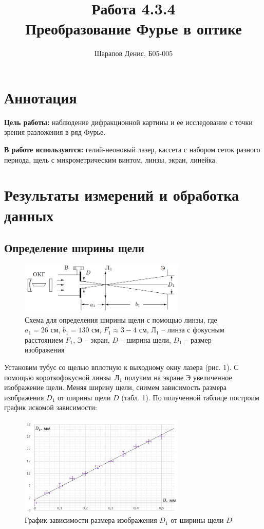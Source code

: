 \documentclass[a4paper]{article}
\title{Работа 4.3.4 \\ Преобразование Фурье в оптике}
\author{Шарапов Денис, Б05-005}
\date{}
\begin{document}
    \maketitle
    \tableofcontents
    \newpage
    
\section{Аннотация}

\noindent\textbf{Цель работы:} наблюдение дифракционной картины и ее исследование с точки зрения разложения в ряд Фурье. \smallskip
 
\noindent \textbf{В работе используются:} гелий-неоновый лазер, кассета с набором сеток разного периода, щель с микрометрическим винтом, линзы, экран, линейка.

\section{Результаты измерений и обработка данных}

\subsection{Определение ширины щели}

\begin{figure}[ht!]
    \centering
    \includegraphics[width = 0.7\textwidth]{image/scheme1.png}
    \caption{Схема для определения ширины щели с помощью линзы, где $a_1 = 26$ см, $b_1 = 130$ см, $F_1 \approx 3-4$ см, Л$_1$ -- линза с фокусным расстоянием $F_1$, Э -- экран, $D$ -- ширина щели, $D_1$ -- размер изображения}
\end{figure}

Установим тубус со щелью вплотную к выходному окну лазера (рис. 1). С помощью короткофокусной линзы~Л$_1$ получим на экране Э увеличенное изображение щели. Меняя ширину щели, снимем зависимость размера изображения $D_1$ от ширины щели $D$ (табл. 1). По полученной таблице построим график искомой зависимости:

\begin{figure}[h!]
    \centering
    \includegraphics[width = 0.7\textwidth]{image/graph1.png}
    \caption{График зависимости размера изображения $D_1$ от ширины щели $D$}
\end{figure}
\end{document}
